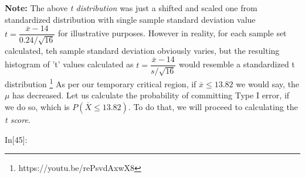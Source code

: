 \documentclass[float=false,crop=false]{standalone}
\begin{document}
    \textbf{Note:}
The above \textit{t distribution} was just a shifted and scaled one from standardized distribution with single sample standard deviation value $t = \dfrac{\overline{x} - 14}{0.24/\sqrt{16}}$ for illustrative purposes. However in reality, for each sample set calculated, teh sample standard deviation obviously varies, but the resulting histogram of 't' values calculated as $t = \dfrac{\overline{x} - 14}{s/\sqrt{16}}$ would resemble a standardized t distribution \footnote{https://youtu.be/rePsvdAxwX8}
    As per our temporary critical region, if \(\overline{x} \leq 13.82\) we
would say, the \(\mu\) has decreased. Let us calculate the probability
of committing Type I error, if we do so, which is
\(P(\overline{X} \leq 13.82)\). To do that, we will proceed to
calculating the \emph{t score}.
\begin{InVerbatim}[commandchars=\\\{\},fontsize=\scriptsize]
{\color{incolor}In[{\color{incolor}45}]:}     
                 
                
               
               
         
            
                
                
                   
                    
         
               
              
           
\end{InVerbatim}
\end{document}
